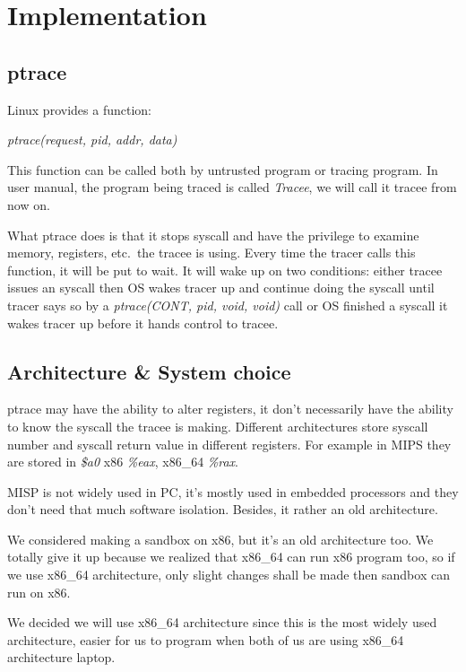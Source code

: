 \documentclass[conference,compsoc]{IEEEtran}
\begin{document}
\section{Implementation}


	\subsection{ptrace}

		\par
			Linux provides a function:\\
				\begin{center}
				\emph{ptrace(request, pid, addr, data)}
				\end{center}
			This function can be called both by untrusted program or tracing program. 
			In user manual, the program being traced is called \emph{Tracee}, we will call it tracee from now on.
		\par 
			What ptrace does is that it stops syscall and have the privilege to examine memory, registers, etc.\ the tracee is using. 
			Every time the tracer calls this function, it will be put to wait. 
			It will wake up on two conditions: either tracee issues an syscall then OS wakes tracer up and continue doing the syscall until tracer says so by a \emph{ptrace(CONT, pid, void, void)} call or OS finished a syscall it wakes tracer up before it hands control to tracee.

	\subsection{Architecture \& System choice}

		\par
			ptrace may have the ability to alter registers, it don't necessarily have the ability to know the syscall the tracee is making. 
			Different architectures store syscall number and syscall return value in different registers. 
			For example in MIPS they are stored in \emph{\$a0} x86 \emph{\%eax}, x86\_64 \emph{\%rax}.
		\par
			MISP is not widely used in PC, it's mostly used in embedded processors and they don't need that much software isolation. 
			Besides, it rather an old architecture.
		\par 
			We considered making a sandbox on x86, but it's an old architecture too. 
			We totally give it up because we realized that x86\_64 can run x86 program too, so if we use x86\_64 architecture, only slight changes shall be made then sandbox can run on x86.
		\par 
			We decided we will use x86\_64 architecture since this is the most widely used architecture, easier for us to program when both of us are using x86\_64 architecture laptop.
\end{document}
